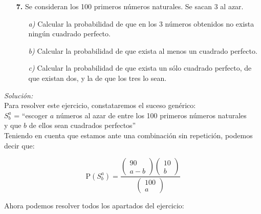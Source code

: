 \documentclass[11pt,a4paper]{article}
\theoremstyle{definition}
\begin{document}


\pagebreak

\begin{itemize}
	\item[\textbf{7.}] Se consideran los 100 primeros números naturales. Se sacan 3 al azar.
	\begin{itemize}
		\item[\emph{a)}] Calcular la probabilidad de que en los 3 números obtenidos no exista ningún cuadrado perfecto.
		\item[\emph{b)}] Calcular la probabilidad de que exista al menos un cuadrado perfecto.
		\item[\emph{c)}] Calcular la probabilidad de que exista un sólo cuadrado perfecto, de que existan dos, y la de que los tres lo sean.
	\end{itemize}
\end{itemize}

{\color{grey}\hrulefill}

\emph{Solución:}\\

Para resolver este ejercicio, constataremos el suceso genérico:\\

\hspace*{1cm}$S^a_b$ = ``escoger $a$ números al azar de entre los 100 primeros números naturales\\
\hspace*{2.1cm}y que $b$ de ellos sean cuadrados perfectos''\\

Teniendo en cuenta que estamos ante una combinación sin repetición, podemos decir que:

$$ \text{P}(S^a_b) = \frac{\left(\begin{matrix}90 \\ a-b\end{matrix}\right) \left(\begin{matrix}10 \\ b\end{matrix}\right)}{\left(\begin{matrix}100 \\ a\end{matrix}\right)} $$

Ahora podemos resolver todos los apartados del ejercicio:
\end{document}
